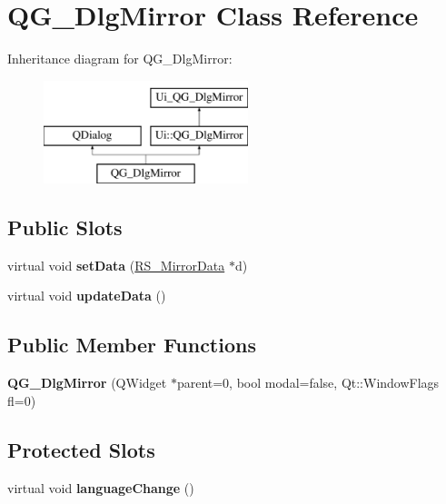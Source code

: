 \hypertarget{classQG__DlgMirror}{\section{Q\-G\-\_\-\-Dlg\-Mirror Class Reference}
\label{classQG__DlgMirror}
}
Inheritance diagram for Q\-G\-\_\-\-Dlg\-Mirror\-:\begin{figure}[H]
\begin{center}
\leavevmode
\includegraphics[height=3.000000cm]{classQG__DlgMirror}
\end{center}
\end{figure}
\subsection*{Public Slots}
\begin{DoxyCompactItemize}
\item 
\hypertarget{classQG__DlgMirror_aa604077d11960a88645eccf7e62e298f}{virtual void {\bfseries set\-Data} (\hyperlink{classRS__MirrorData}{R\-S\-\_\-\-Mirror\-Data} $\ast$d)}\label{classQG__DlgMirror_aa604077d11960a88645eccf7e62e298f}

\item 
\hypertarget{classQG__DlgMirror_a8671e539d07ff881f4cff835f3b654cb}{virtual void {\bfseries update\-Data} ()}\label{classQG__DlgMirror_a8671e539d07ff881f4cff835f3b654cb}

\end{DoxyCompactItemize}
\subsection*{Public Member Functions}
\begin{DoxyCompactItemize}
\item 
\hypertarget{classQG__DlgMirror_ad45870347c09ecf05f8f8642ec85ba3c}{{\bfseries Q\-G\-\_\-\-Dlg\-Mirror} (Q\-Widget $\ast$parent=0, bool modal=false, Qt\-::\-Window\-Flags fl=0)}\label{classQG__DlgMirror_ad45870347c09ecf05f8f8642ec85ba3c}

\end{DoxyCompactItemize}
\subsection*{Protected Slots}
\begin{DoxyCompactItemize}
\item 
\hypertarget{classQG__DlgMirror_a0bee036d1aac12710fe7642ffd8aebcd}{virtual void {\bfseries language\-Change} ()}\label{classQG__DlgMirror_a0bee036d1aac12710fe7642ffd8aebcd}

\end{DoxyCompactItemize}
